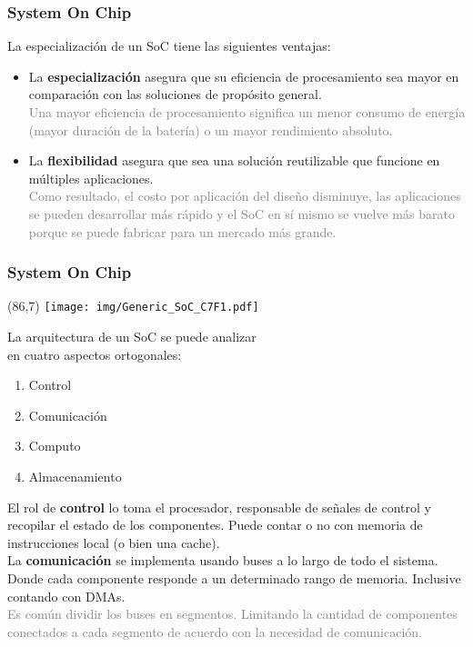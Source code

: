 \documentclass[aspectratio=169]{beamer}
\begin{document}
\begin{frame}[t,fragile]
    \frametitle{System On Chip}
    La especialización de un SoC tiene las siguientes ventajas:\\
    \vspace{0.3cm}
    \begin{itemize}
    \setlength\itemsep{0.5cm}
    \item<1-> La \textbf{especialización} asegura que su eficiencia de procesamiento sea mayor en comparación con las soluciones de propósito general.\\
    \textcolor{gray}{Una mayor eficiencia de procesamiento significa un menor consumo de energía (mayor duración de la batería) o un mayor rendimiento absoluto.}
    \item<2-> La \textbf{flexibilidad} asegura que sea una solución reutilizable que funcione en múltiples aplicaciones.\\
    \textcolor{gray}{Como resultado, el costo por aplicación del diseño disminuye, las aplicaciones se pueden desarrollar más rápido y el SoC en sí mismo se vuelve más barato porque se puede fabricar para un mercado más grande.}
    \end{itemize}
\end{frame}

\begin{frame}[t,fragile]
    \frametitle{System On Chip}
    \begin{textblock}{10}(86,7) \texttt{[image: img/Generic\_SoC\_C7F1.pdf]} \end{textblock}
    La arquitectura de un SoC se puede analizar\\ en cuatro aspectos ortogonales:\\
    \begin{enumerate}
    \item Control
    \item Comunicación
    \item Computo
    \item Almacenamiento
    \end{enumerate}
    \vspace{0.2cm}
    \small
    \pause
    El rol de \textbf{control} lo toma el procesador, responsable de señales de control y recopilar el estado de los componentes.
    Puede contar o no con memoria de instrucciones local (o bien una cache).\\
    \vspace{0.2cm}
    \pause
    La \textbf{comunicación} se implementa usando buses a lo largo de todo el sistema. Donde cada componente responde a un determinado rango de memoria. Inclusive contando con DMAs.\\
    \vspace{0.2cm}
    \pause
    \textcolor{gray}{Es común dividir los buses en segmentos. Limitando la cantidad de componentes conectados a cada segmento de acuerdo con la necesidad de comunicación.}
\end{frame}
\end{document}
